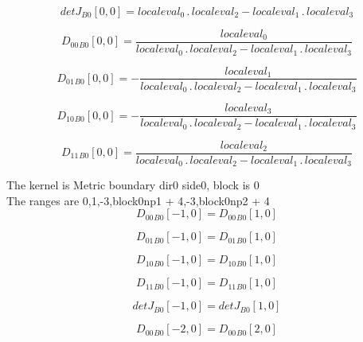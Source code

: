 \documentclass{article}
\begin{document}
\begin{dmath}{detJ{_{B0}}}[{0,0}] = localeval_{0} \,.\, localeval_{2} - localeval_{1} \,.\, localeval_{3}\end{dmath}

\begin{dmath}{D_{00}{_{B0}}}[{0,0}] = \frac{localeval_{0}}{localeval_{0} \,.\, localeval_{2} - localeval_{1} \,.\, localeval_{3}}\end{dmath}

\begin{dmath}{D_{01}{_{B0}}}[{0,0}] = - \frac{localeval_{1}}{localeval_{0} \,.\, localeval_{2} - localeval_{1} \,.\, localeval_{3}}\end{dmath}

\begin{dmath}{D_{10}{_{B0}}}[{0,0}] = - \frac{localeval_{3}}{localeval_{0} \,.\, localeval_{2} - localeval_{1} \,.\, localeval_{3}}\end{dmath}

\begin{dmath}{D_{11}{_{B0}}}[{0,0}] = \frac{localeval_{2}}{localeval_{0} \,.\, localeval_{2} - localeval_{1} \,.\, localeval_{3}}\end{dmath}

\noindent The kernel is Metric boundary dir0 side0, block is 0\\\noindent The ranges are 0,1,-3,block0np1 + 4,-3,block0np2 + 4\\\begin{dmath}{D_{00}{_{B0}}}[{-1,0}] = {D_{00}{_{B0}}}[{1,0}]\end{dmath}

\begin{dmath}{D_{01}{_{B0}}}[{-1,0}] = {D_{01}{_{B0}}}[{1,0}]\end{dmath}

\begin{dmath}{D_{10}{_{B0}}}[{-1,0}] = {D_{10}{_{B0}}}[{1,0}]\end{dmath}

\begin{dmath}{D_{11}{_{B0}}}[{-1,0}] = {D_{11}{_{B0}}}[{1,0}]\end{dmath}

\begin{dmath}{detJ{_{B0}}}[{-1,0}] = {detJ{_{B0}}}[{1,0}]\end{dmath}

\begin{dmath}{D_{00}{_{B0}}}[{-2,0}] = {D_{00}{_{B0}}}[{2,0}]\end{dmath}
\end{document}
